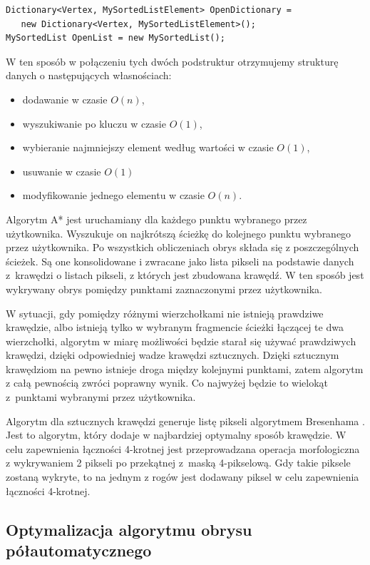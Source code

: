 \documentclass[a4paper,11pt,twoside,openright]{report}
\theoremstyle{definition}
\begin{document}
\begin{verbatim}
Dictionary<Vertex, MySortedListElement> OpenDictionary =
   new Dictionary<Vertex, MySortedListElement>();
MySortedList OpenList = new MySortedList();
\end{verbatim}

W ten sposób w połączeniu tych dwóch podstruktur otrzymujemy strukturę danych
o następujących własnościach:
\begin{itemize}[noitemsep]
\item dodawanie w czasie $O(n)$,
\item wyszukiwanie po kluczu w czasie $O(1)$,
\item wybieranie najmniejszy element według wartości w czasie $O(1)$,
\item usuwanie w czasie $O(1)$
\item modyfikowanie jednego elementu w czasie $O(n)$.
\end{itemize}

Algorytm A* jest uruchamiany dla każdego punktu wybranego przez użytkownika.
Wyszukuje on najkrótszą ścieżkę do kolejnego punktu wybranego przez użytkownika.
Po wszystkich obliczeniach obrys składa się z poszczególnych ścieżek. Są one
konsolidowane i zwracane jako lista pikseli na podstawie danych z~krawędzi o
listach pikseli, z których jest zbudowana krawędź. W ten sposób jest wykrywany
obrys pomiędzy punktami zaznaczonymi przez użytkownika.

W sytuacji, gdy pomiędzy różnymi wierzchołkami nie istnieją prawdziwe krawędzie,
albo istnieją tylko w wybranym fragmencie ścieżki łączącej te dwa wierzchołki,
algorytm w miarę możliwości będzie starał się używać prawdziwych krawędzi, dzięki
odpowiedniej wadze krawędzi sztucznych. Dzięki sztucznym krawędziom na pewno
istnieje droga między kolejnymi punktami, zatem algorytm z całą pewnością zwróci
poprawny wynik. Co najwyżej będzie to wielokąt z~punktami wybranymi przez użytkownika.

Algorytm dla sztucznych krawędzi generuje listę pikseli algorytmem Bresenhama
\cite{Bresenham}. Jest to algorytm, który dodaje w najbardziej optymalny sposób
krawędzie. W celu zapewnienia łączności 4-krotnej jest przeprowadzana operacja
morfologiczna z wykrywaniem 2 pikseli po przekątnej z~maską 4-pikselową. Gdy takie
piksele zostaną wykryte, to na jednym z rogów jest dodawany piksel w celu
zapewnienia łączności 4-krotnej.

\subsection {Optymalizacja algorytmu obrysu półautomatycznego}
\end{document}
